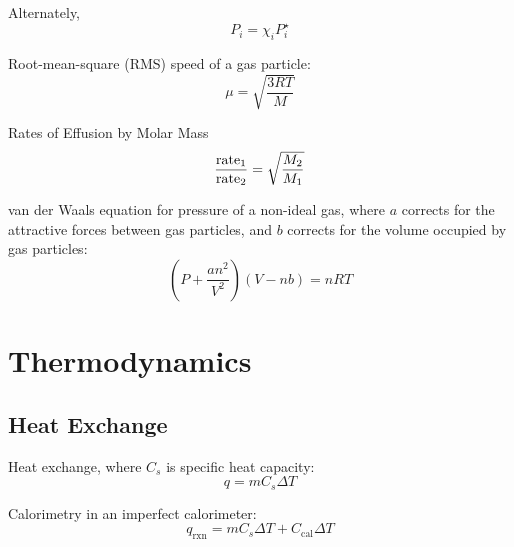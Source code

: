 \documentclass[10pt]{article}
\begin{document}
Alternately,
\begin{equation*}
P_i=\chi_iP_i^\star
\end{equation*}

Root-mean-square (RMS) speed of a gas particle:
\begin{equation*}
\mu = \sqrt{\frac{3RT}{M}}
\end{equation*}

Rates of Effusion by Molar Mass
\begin{equation*}
\frac{\textnormal{rate}_1}{\textnormal{rate}_2} = \sqrt{\frac{M_2}{M_1}}
\end{equation*}

van der Waals equation for pressure of a non-ideal gas, where $a$ corrects for the attractive forces between gas particles, and $b$ corrects for the volume occupied by gas particles:
\begin{equation*}
\left(P+\frac{an^2}{V^2}\right)(V-nb)=nRT
\end{equation*}


\section{Thermodynamics}


\subsection{Heat Exchange}

Heat exchange, where $C_s$ is specific heat capacity:
\begin{equation*}
q=mC_s\Delta T
\end{equation*}

Calorimetry in an imperfect calorimeter:
\begin{equation*}
q_\textrm{rxn}=mC_s\Delta T + C_\textrm{cal}\Delta T
\end{equation*}
\end{document}
